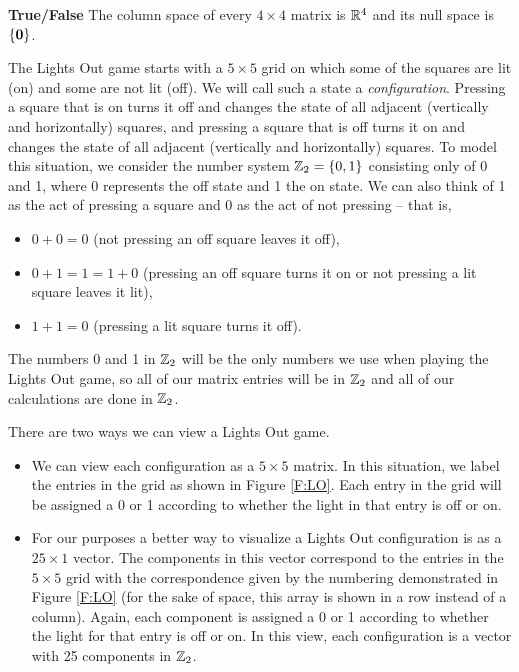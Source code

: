 \item \textbf{True/False} The column space of every $4\times 4$ matrix is $\mathbb{R}^4$ and its null space is $\{\mathbf{0}\}$.

\ea

\ee

The Lights Out game starts with a $5 \times 5$ grid on which some of the squares are lit (on) and some are not lit (off). We will call such a state a \emph{configuration}. Pressing a square that is on turns it off and changes the state of all adjacent (vertically and horizontally) squares, and pressing a square that is off turns it on and changes the state of all adjacent (vertically and horizontally) squares. To model this situation, we consider the number system $\mathbb{Z}_2 = \{0,1\}$ consisting only of 0 and 1, where 0 represents the off state and 1 the on state. We can also think of 1 as the act of pressing a square and 0 as the act of not pressing -- that is,
\begin{itemize}
\item $0+0 = 0$ (not pressing an off square leaves it off),
\item $0+1 = 1 = 1 + 0$ (pressing an off square turns it on or not pressing a lit square leaves it lit),
\item $1+1 = 0$ (pressing a lit square turns it off).
\end{itemize}

The numbers 0 and 1 in $\mathbb{Z}_2$ will be the only numbers we use when playing the Lights Out game, so all of our matrix entries will be in $\mathbb{Z}_2$ and all of our calculations are done in $\mathbb{Z}_2$. 

There are two ways we can view a Lights Out game.
\begin{itemize}
\item We can view each configuration as a $5 \times 5$ matrix. In this situation, we label the entries in the grid as shown in Figure \ref{F:LO}. Each entry in the grid will be assigned a 0 or 1 according to whether the light in that entry is off or on.

\item For our purposes a better way to visualize a Lights Out configuration is as a $25 \times 1$ vector. The components in this vector correspond to the entries in the $5 \times 5$ grid with the correspondence given by the numbering demonstrated in Figure \ref{F:LO} (for the sake of space, this array is shown in a row instead of a column). Again, each component is assigned a 0 or 1 according to whether the light for that entry is off or on. In this view, each configuration is a vector with 25 components in $\mathbb{Z}_2$.
\end{itemize}

